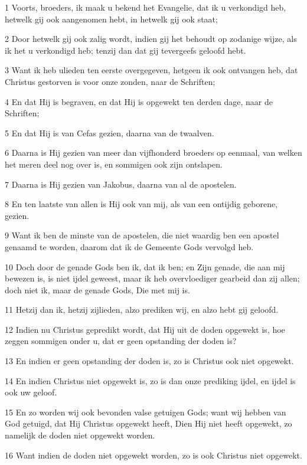 \par 1 Voorts, broeders, ik maak u bekend het Evangelie, dat ik u verkondigd heb, hetwelk gij ook aangenomen hebt, in hetwelk gij ook staat;
\par 2 Door hetwelk gij ook zalig wordt, indien gij het behoudt op zodanige wijze, als ik het u verkondigd heb; tenzij dan dat gij tevergeefs geloofd hebt.
\par 3 Want ik heb ulieden ten eerste overgegeven, hetgeen ik ook ontvangen heb, dat Christus gestorven is voor onze zonden, naar de Schriften;
\par 4 En dat Hij is begraven, en dat Hij is opgewekt ten derden dage, naar de Schriften;
\par 5 En dat Hij is van Cefas gezien, daarna van de twaalven.
\par 6 Daarna is Hij gezien van meer dan vijfhonderd broeders op eenmaal, van welken het meren deel nog over is, en sommigen ook zijn ontslapen.
\par 7 Daarna is Hij gezien van Jakobus, daarna van al de apostelen.
\par 8 En ten laatste van allen is Hij ook van mij, als van een ontijdig geborene, gezien.
\par 9 Want ik ben de minste van de apostelen, die niet waardig ben een apostel genaamd te worden, daarom dat ik de Gemeente Gods vervolgd heb.
\par 10 Doch door de genade Gods ben ik, dat ik ben; en Zijn genade, die aan mij bewezen is, is niet ijdel geweest, maar ik heb overvloediger gearbeid dan zij allen; doch niet ik, maar de genade Gods, Die met mij is.
\par 11 Hetzij dan ik, hetzij zijlieden, alzo prediken wij, en alzo hebt gij geloofd.
\par 12 Indien nu Christus gepredikt wordt, dat Hij uit de doden opgewekt is, hoe zeggen sommigen onder u, dat er geen opstanding der doden is?
\par 13 En indien er geen opstanding der doden is, zo is Christus ook niet opgewekt.
\par 14 En indien Christus niet opgewekt is, zo is dan onze prediking ijdel, en ijdel is ook uw geloof.
\par 15 En zo worden wij ook bevonden valse getuigen Gods; want wij hebben van God getuigd, dat Hij Christus opgewekt heeft, Dien Hij niet heeft opgewekt, zo namelijk de doden niet opgewekt worden.
\par 16 Want indien de doden niet opgewekt worden, zo is ook Christus niet opgewekt.
